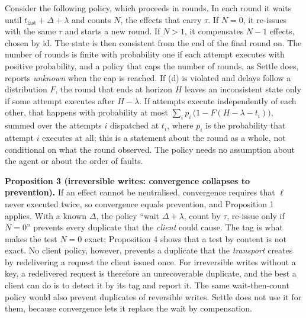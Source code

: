 \documentclass[
  10pt,
]{article}
\begin{document}
Consider the following policy, which proceeds in rounds. In each round
it waits until \(t_{\text{last}} + \Delta + \lambda\) and counts \(N\),
the effects that carry \(\tau\). If \(N = 0\), it re-issues with the
same \(\tau\) and starts a new round. If \(N > 1\), it compensates
\(N-1\) effects, chosen by id. The state is then consistent from the end
of the final round on. The number of rounds is finite with probability
one if each attempt executes with positive probability, and a policy
that caps the number of rounds, as Settle does, reports \emph{unknown}
when the cap is reached. If (d) is violated and delays follow a
distribution \(F\), the round that ends at horizon \(H\) leaves an
inconsistent state only if some attempt executes after \(H - \lambda\).
If attempts execute independently of each other, that happens with
probability at most \(\sum_i p_i\,\big(1 - F(H - \lambda - t_i)\big)\),
summed over the attempts \(i\) dispatched at \(t_i\), where \(p_i\) is
the probability that attempt \(i\) executes at all; this is a statement
about the round as a whole, not conditional on what the round observed.
The policy needs no assumption about the agent or about the order of
faults.

\textbf{Proposition 3 (irreversible writes: convergence collapses to
prevention).} If an effect cannot be neutralised, convergence requires
that \(\ell\) never executed twice, so convergence equals prevention,
and Proposition 1 applies. With a known \(\Delta\), the policy ``wait
\(\Delta + \lambda\), count by \(\tau\), re-issue only if \(N = 0\)''
prevents every duplicate that the \emph{client} could cause. The tag is
what makes the test \(N = 0\) exact; Proposition 4 shows that a test by
content is not exact. No client policy, however, prevents a duplicate
that the \emph{transport} creates by redelivering a request the client
issued once. For irreversible writes without a key, a redelivered
request is therefore an unrecoverable duplicate, and the best a client
can do is to detect it by its tag and report it. The same
wait-then-count policy would also prevent duplicates of reversible
writes. Settle does not use it for them, because convergence lets it
replace the wait by compensation.
\end{document}

